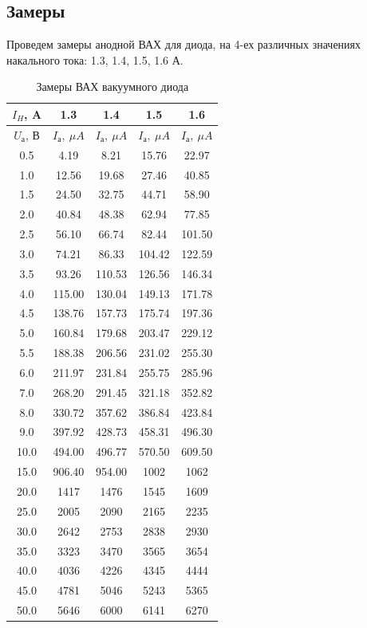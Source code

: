 \documentclass[a4paper, 12pt]{article}%
\begin{document}
	\subsection{Замеры}
	Проведем замеры анодной ВАХ для диода, на 4-ех различных значениях накального тока: 1.3, 1.4, 1.5, 1.6 А.
	\begin{table}[H]
		\centering
		\begin{tabular}{|c|c|c|c|c|}
			\hline
			$I_H$, A & 1.3     & 1.4     & 1.5     & 1.6     \\ \hline
			$U_а$, В    & $I_а,~ \mu A$   & $I_а,~ \mu A$   & $I_а,~ \mu A$   & $I_а,~ \mu A$   \\ \hline
			0.5     & 4.19    & 8.21    & 15.76   & 22.97   \\ \hline
			1.0     & 12.56   & 19.68   & 27.46   & 40.85   \\ \hline
			1.5     & 24.50   & 32.75   & 44.71   & 58.90   \\ \hline
			2.0     & 40.84   & 48.38   & 62.94   & 77.85   \\ \hline
			2.5     & 56.10   & 66.74   & 82.44   & 101.50  \\ \hline
			3.0     & 74.21   & 86.33   & 104.42  & 122.59  \\ \hline
			3.5     & 93.26   & 110.53  & 126.56  & 146.34  \\ \hline
			4.0     & 115.00  & 130.04  & 149.13  & 171.78  \\ \hline
			4.5     & 138.76  & 157.73  & 175.74  & 197.36  \\ \hline
			5.0     & 160.84  & 179.68  & 203.47  & 229.12  \\ \hline
			5.5     & 188.38  & 206.56  & 231.02  & 255.30  \\ \hline
			6.0     & 211.97  & 231.84  & 255.75  & 285.96  \\ \hline
			7.0     & 268.20  & 291.45  & 321.18  & 352.82  \\ \hline
			8.0     & 330.72  & 357.62  & 386.84  & 423.84  \\ \hline
			9.0     & 397.92  & 428.73  & 458.31  & 496.30  \\ \hline
			10.0    & 494.00  & 496.77  & 570.50  & 609.50  \\ \hline
			15.0    & 906.40  & 954.00  & 1002 & 1062 \\ \hline
			20.0    & 1417 & 1476 & 1545 & 1609 \\ \hline
			25.0    & 2005 & 2090 & 2165 & 2235 \\ \hline
			30.0    & 2642 & 2753 & 2838 & 2930 \\ \hline
			35.0    & 3323 & 3470 & 3565 & 3654 \\ \hline
			40.0    & 4036 & 4226 & 4345 & 4444 \\ \hline
			45.0    & 4781 & 5046 & 5243 & 5365 \\ \hline
			50.0    & 5646 & 6000 & 6141 & 6270 \\ \hline
		\end{tabular}
		\caption{Замеры ВАХ вакуумного диода}
	\end{table}
\end{document}
